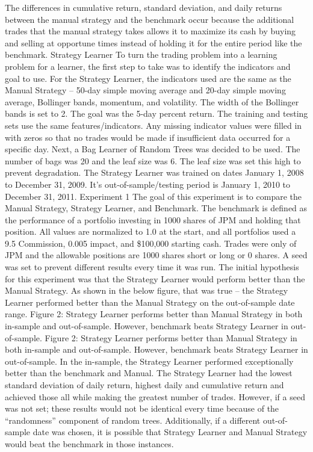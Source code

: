 \documentclass{article}
\begin{document}
The differences in cumulative return, standard deviation, and daily returns between the manual strategy and the benchmark occur because the additional trades that the manual strategy takes allows it to maximize its cash by buying and selling at opportune times instead of holding it for the entire period like the benchmark.
Strategy Learner
To turn the trading problem into a learning problem for a learner, the first step to take was to identify the indicators and goal to use. For the Strategy Learner, the indicators used are the same as the Manual Strategy – 50-day simple moving average and 20-day simple moving average, Bollinger bands, momentum, and volatility. The width of the Bollinger bands is set to 2. The goal was the 5-day percent return. The training and testing sets use the same features/indicators. Any missing indicator values were filled in with zeros so that no trades would be made if insufficient data occurred for a specific day.
Next, a Bag Learner of Random Trees was decided to be used. The number of bags was 20 and the leaf size was 6. The leaf size was set this high to prevent degradation. The Strategy Learner was trained on dates January 1, 2008 to December 31, 2009. It’s out-of-sample/testing period is January 1, 2010 to December 31, 2011.
Experiment 1
The goal of this experiment is to compare the Manual Strategy, Strategy Learner, and Benchmark. The benchmark is defined as the performance of a portfolio investing in 1000 shares of JPM and holding that position. All values are normalized to 1.0 at the start, and all portfolios used a 9.5 Commission, 0.005 impact, and \$100,000 starting cash. Trades were only of JPM and the allowable positions are 1000 shares short or long or 0 shares. A seed was set to prevent different results every time it was run.
The initial hypothesis for this experiment was that the Strategy Learner would perform better than the Manual Strategy. As shown in the below figure, that was true – the Strategy Learner performed better than the Manual Strategy on the out-of-sample date range.
Figure 2: Strategy Learner performs better than Manual Strategy in both in-sample and out-of-sample. However, benchmark beats Strategy Learner in out-of-sample.
Figure 2: Strategy Learner performs better than Manual Strategy in both in-sample and out-of-sample. However, benchmark beats Strategy Learner in out-of-sample.
In the in-sample, the Strategy Learner performed exceptionally better than the benchmark and Manual. The Strategy Learner had the lowest standard deviation of daily return, highest daily and cumulative return and achieved those all while making the greatest number of trades.
However, if a seed was not set; these results would not be identical every time because of the “randomness” component of random trees. Additionally, if a different out-of-sample date was chosen, it is possible that Strategy Learner and Manual Strategy would beat the benchmark in those instances.\\
\end{document}
